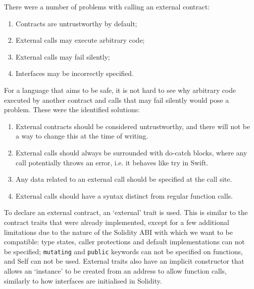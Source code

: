 There were a number of problems with calling an external contract:

\begin{enumerate}
	\item Contracts are untrustworthy by default;
	\item External calls may execute arbitrary code;
	\item External calls may fail silently;
	\item Interfaces may be incorrectly specified.
\end{enumerate}

For a language that aims to be safe, it is not hard to see why arbitrary code executed by another contract and calls that may fail silently would pose a problem. These were the identified solutions:

\begin{enumerate}
	\item External contracts should be considered untrustworthy, and there will not be a way to change this at the time of writing.
	\item External calls should always be surrounded with do-catch blocks, where any call potentially throws an error, i.e. it behaves like try in Swift.
	\item Any data related to an external call should be specified at the call site.
	\item External calls should have a syntax distinct from regular function calls.
\end{enumerate}

To declare an external contract, an `external' trait is used. This is similar to the contract traits that were already implemented, except for a few additional limitations due to the nature of the Solidity ABI with which we want to be compatible: type states, caller protections and default implementations can not be specified; \texttt{mutating} and \texttt{public} keywords can not be specified on functions, and Self can not be used. External traits also have an implicit constructor that allows an `instance' to be created from an address to allow function calls, similarly to how interfaces are initialised in Solidity.

